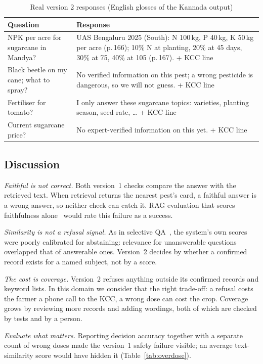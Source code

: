 \documentclass[conference]{IEEEtran}
\begin{document}
\begin{table}[t]
\centering
\caption{Real version 2 responses (English glosses of the Kannada output)}
\label{tab:examples}
\footnotesize
\begin{tabular}{p{2.5cm}p{5.2cm}}
\toprule
Question & Response\\
\midrule
NPK per acre for sugarcane in Mandya? & UAS Bengaluru 2025 (South): N 100\,kg, P 40\,kg, K 50\,kg per acre (p.\,166); 10\% N at planting, 20\% at 45 days, 30\% at 75, 40\% at 105 (p.\,167). + KCC line\\
\addlinespace
Black beetle on my cane; what to spray? & No verified information on this pest; a wrong pesticide is dangerous, so we will not guess. + KCC line\\
\addlinespace
Fertiliser for tomato? & I only answer these sugarcane topics: varieties, planting season, seed rate, \dots{} + KCC line\\
\addlinespace
Current sugarcane price? & No expert-verified information on this yet. + KCC line\\
\bottomrule
\end{tabular}
\end{table}

\subsection{Discussion}
\textit{Faithful is not correct.} Both version~1 checks compare the answer with the retrieved
text. When retrieval returns the nearest pest's card, a faithful answer is a wrong answer, so
neither check can catch it. RAG evaluation that scores faithfulness alone~\cite{es2023ragas}
would rate this failure as a success.

\textit{Similarity is not a refusal signal.} As in selective QA~\cite{kamath2020selective},
the system's own scores were poorly calibrated for abstaining: relevance for unanswerable
questions overlapped that of answerable ones. Version~2 decides by whether a confirmed record
exists for a named subject, not by a score.

\textit{The cost is coverage.} Version~2 refuses anything outside its confirmed records and
keyword lists. In this domain we consider that the right trade-off: a refusal costs the farmer
a phone call to the KCC, a wrong dose can cost the crop. Coverage grows by reviewing more
records and adding wordings, both of which are checked by tests and by a person.

\textit{Evaluate what matters.} Reporting decision accuracy together with a separate count of
wrong doses made the version~1 safety failure visible; an average text-similarity score would
have hidden it (Table~\ref{tab:overdose}).
\end{document}
